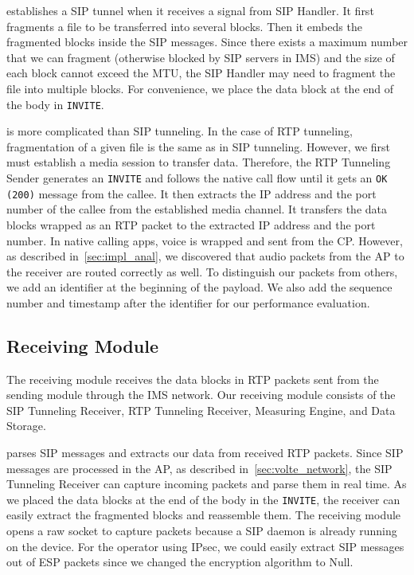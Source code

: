  establishes a SIP tunnel when it
receives a signal from SIP Handler. It first fragments a file to be
transferred into several blocks.  Then it embeds the fragmented blocks
inside the SIP messages.  Since there exists a maximum number that we
can fragment (otherwise blocked by SIP servers in IMS) and the size of
each block cannot exceed the MTU, the SIP Handler may need to fragment the
file into multiple blocks.  For convenience, we place the data block
at the end of the body in {\tt INVITE}.

 is more complicated than
SIP tunneling.  In the case of RTP tunneling, fragmentation of a given file
is the same as in SIP tunneling. However, we first must establish
a media session to transfer data. Therefore, the RTP Tunneling Sender
generates an {\tt INVITE} and follows the native call flow until it gets an
{\tt OK (200)} message from the callee. It then extracts the IP
address and the port number of the callee from the established media
channel. It transfers the data blocks wrapped as an RTP packet to the
extracted IP address and the port number. In native calling apps,
voice is wrapped and sent from the CP. However, as described in~\autoref{sec:impl_anal}, 
we discovered that audio
packets from the AP to the receiver are routed correctly as well. To
distinguish our packets from others, we add an identifier at the
beginning of the payload. We also add the sequence number and
timestamp after the identifier for our performance evaluation.



\subsection{Receiving Module}
\label{sec:receiving_module}


The receiving module receives the data blocks in RTP packets sent from the
sending module through the IMS network. Our receiving module consists
of the SIP Tunneling Receiver, RTP Tunneling Receiver, Measuring Engine,
and Data Storage.

 parses SIP messages and extracts
our data from received RTP packets.  Since SIP messages are processed
in the AP, as described in~\autoref{sec:volte_network}, the SIP Tunneling
Receiver can capture incoming packets and parse them in real time. As
we placed the data blocks at the end of the body in the {\tt INVITE}, the
receiver can easily extract the fragmented blocks and reassemble
them. The receiving module opens a raw socket to capture packets
because a SIP daemon is already running on the device.  For the
operator using IPsec, we could easily extract SIP messages out of ESP
packets since we changed the encryption algorithm to Null.


